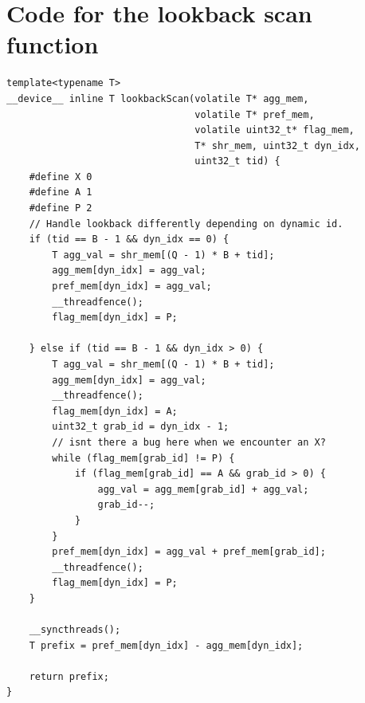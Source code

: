 \documentclass[twocolumn]{article}
\begin{document}
\section{Code for the lookback scan function}
\begin{lstlisting}[caption=Lookback kernel,label=lst:lookbackScan]
template<typename T>
__device__ inline T lookbackScan(volatile T* agg_mem,
                                 volatile T* pref_mem,
                                 volatile uint32_t* flag_mem,
                                 T* shr_mem, uint32_t dyn_idx,
                                 uint32_t tid) {
    #define X 0
    #define A 1
    #define P 2
	// Handle lookback differently depending on dynamic id.
    if (tid == B - 1 && dyn_idx == 0) {
		T agg_val = shr_mem[(Q - 1) * B + tid];
		agg_mem[dyn_idx] = agg_val;
        pref_mem[dyn_idx] = agg_val;
        __threadfence();
        flag_mem[dyn_idx] = P;

    } else if (tid == B - 1 && dyn_idx > 0) {
		T agg_val = shr_mem[(Q - 1) * B + tid];
        agg_mem[dyn_idx] = agg_val;
        __threadfence();
        flag_mem[dyn_idx] = A;
        uint32_t grab_id = dyn_idx - 1;
        // isnt there a bug here when we encounter an X?
        while (flag_mem[grab_id] != P) {
            if (flag_mem[grab_id] == A && grab_id > 0) {
                agg_val = agg_mem[grab_id] + agg_val;
                grab_id--;
            }
        }
		pref_mem[dyn_idx] = agg_val + pref_mem[grab_id];
        __threadfence();
        flag_mem[dyn_idx] = P;
    }

	__syncthreads();
	T prefix = pref_mem[dyn_idx] - agg_mem[dyn_idx];

    return prefix;
}
\end{lstlisting}
\end{document}
